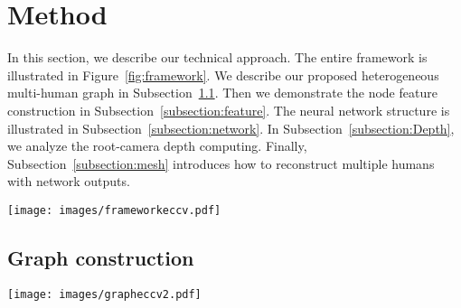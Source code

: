 \documentclass[runningheads]{llncs}
\begin{document}
\section{Method}
In this section, we describe our technical approach. The entire framework is illustrated in Figure~\ref{fig:framework}. We describe our proposed heterogeneous multi-human graph in Subsection~\ref{subsection:graph}. Then we demonstrate the node feature construction in Subsection~\ref{subsection:feature}. The neural network structure is illustrated in Subsection~\ref{subsection:network}. In Subsection~\ref{subsection:Depth}, we analyze the root-camera depth computing. Finally, Subsection~\ref{subsection:mesh} introduces how to reconstruct multiple humans with network outputs.

\begin{figure*}[t!]
  \centering
  {\texttt{[image: images/frameworkeccv.pdf]}}
  \vspace{-12pt}
  \caption{Illustration of the framework. 2D multi-human pose is the input. To explicitly model the inter- and intra-human relation, we build a heterogeneous graph containing joint nodes (blue circles) and mesh nodes (green circles). On top of the graph, we construct node features using 2D pose. The graph network adopts a dual-branch structure. Joint nodes with joint features go through the upper branch (blue blocks), meanwhile mesh nodes with mesh features go through the lower branch (green blocks). One GCN block (orange block) connects these two branches. Finally, the upper branch outputs root-camera depth and the lower branch outputs root-relative mesh coordinates. By combining the outcomes, we can recover the full multi-human meshes. The upper branch also outputs joint coordinates, which plays a supporting role in learning.
  }
  \label{fig:framework}
\vspace{-12pt} 
\end{figure*}
\subsection{Graph construction}\label{subsection:graph}

\begin{figure*}[t!]
  \centering
  {\texttt{[image: images/grapheccv2.pdf]}}
  \vspace{-20pt}
\caption{Structure of the graph. The graph consists of two kinds of nodes, joint nodes  (blue circles) and mesh nodes . Each human corresponds to one subgraph of the whole graph. Within one human, joint nodes are connected to get edge  (green lines) according to body skeleton structure; following body mesh topology, mesh nodes are connected to get edge  (orange lines); each mesh node connects to its two nearest joint nodes, generating edge  (red lines). To represent inter-human relation, we connect joint nodes across humans to get edge  (purple lines). (b-c) shows the graph structure for image (a). For better display, we do not draw mesh nodes and only draw part of edge .} 
\vspace{-12pt} 
 \label{fig:graph}
\end{figure*}
\end{document}
